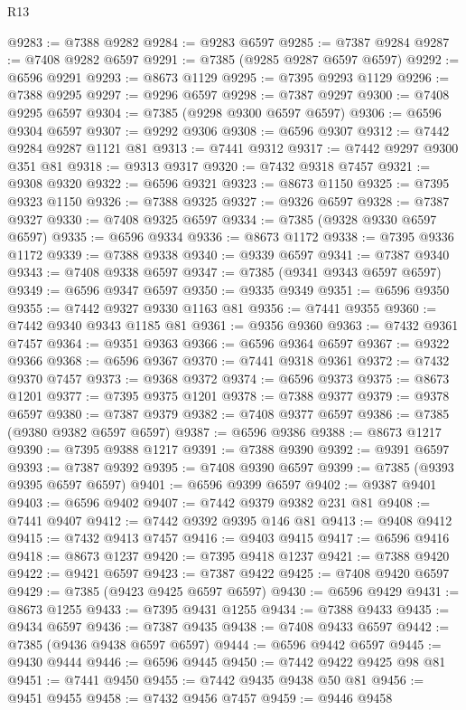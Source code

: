 \begin{lexlean}{R13}
\begin{coremodule}
@9283 := @7388 @9282
@9284 := @9283 @6597
@9285 := @7387 @9284
@9287 := @7408 @9282 @6597
@9291 := @7385 (@9285 @9287 @6597 @6597)
@9292 := @6596 @9291
@9293 := @8673 @1129
@9295 := @7395 @9293 @1129
@9296 := @7388 @9295
@9297 := @9296 @6597
@9298 := @7387 @9297
@9300 := @7408 @9295 @6597
@9304 := @7385 (@9298 @9300 @6597 @6597)
@9306 := @6596 @9304 @6597
@9307 := @9292 @9306
@9308 := @6596 @9307
@9312 := @7442 @9284 @9287 @1121 @81
@9313 := @7441 @9312
@9317 := @7442 @9297 @9300 @351 @81
@9318 := @9313 @9317
@9320 := @7432 @9318 @7457
@9321 := @9308 @9320
@9322 := @6596 @9321
@9323 := @8673 @1150
@9325 := @7395 @9323 @1150
@9326 := @7388 @9325
@9327 := @9326 @6597
@9328 := @7387 @9327
@9330 := @7408 @9325 @6597
@9334 := @7385 (@9328 @9330 @6597 @6597)
@9335 := @6596 @9334
@9336 := @8673 @1172
@9338 := @7395 @9336 @1172
@9339 := @7388 @9338
@9340 := @9339 @6597
@9341 := @7387 @9340
@9343 := @7408 @9338 @6597
@9347 := @7385 (@9341 @9343 @6597 @6597)
@9349 := @6596 @9347 @6597
@9350 := @9335 @9349
@9351 := @6596 @9350
@9355 := @7442 @9327 @9330 @1163 @81
@9356 := @7441 @9355
@9360 := @7442 @9340 @9343 @1185 @81
@9361 := @9356 @9360
@9363 := @7432 @9361 @7457
@9364 := @9351 @9363
@9366 := @6596 @9364 @6597
@9367 := @9322 @9366
@9368 := @6596 @9367
@9370 := @7441 @9318 @9361
@9372 := @7432 @9370 @7457
@9373 := @9368 @9372
@9374 := @6596 @9373
@9375 := @8673 @1201
@9377 := @7395 @9375 @1201
@9378 := @7388 @9377
@9379 := @9378 @6597
@9380 := @7387 @9379
@9382 := @7408 @9377 @6597
@9386 := @7385 (@9380 @9382 @6597 @6597)
@9387 := @6596 @9386
@9388 := @8673 @1217
@9390 := @7395 @9388 @1217
@9391 := @7388 @9390
@9392 := @9391 @6597
@9393 := @7387 @9392
@9395 := @7408 @9390 @6597
@9399 := @7385 (@9393 @9395 @6597 @6597)
@9401 := @6596 @9399 @6597
@9402 := @9387 @9401
@9403 := @6596 @9402
@9407 := @7442 @9379 @9382 @231 @81
@9408 := @7441 @9407
@9412 := @7442 @9392 @9395 @146 @81
@9413 := @9408 @9412
@9415 := @7432 @9413 @7457
@9416 := @9403 @9415
@9417 := @6596 @9416
@9418 := @8673 @1237
@9420 := @7395 @9418 @1237
@9421 := @7388 @9420
@9422 := @9421 @6597
@9423 := @7387 @9422
@9425 := @7408 @9420 @6597
@9429 := @7385 (@9423 @9425 @6597 @6597)
@9430 := @6596 @9429
@9431 := @8673 @1255
@9433 := @7395 @9431 @1255
@9434 := @7388 @9433
@9435 := @9434 @6597
@9436 := @7387 @9435
@9438 := @7408 @9433 @6597
@9442 := @7385 (@9436 @9438 @6597 @6597)
@9444 := @6596 @9442 @6597
@9445 := @9430 @9444
@9446 := @6596 @9445
@9450 := @7442 @9422 @9425 @98 @81
@9451 := @7441 @9450
@9455 := @7442 @9435 @9438 @50 @81
@9456 := @9451 @9455
@9458 := @7432 @9456 @7457
@9459 := @9446 @9458

\end{coremodule}
\end{lexlean}
